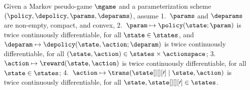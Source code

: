 
\begin{assumption}
\label{assum:param_lipschitz}
Given a Markov pseudo-game $\mgame$ and a parameterization scheme $(\policy, \depolicy, \params, \deparams)$, assume
1.~$\params$ and $\deparams$ are non-empty, compact, and convex,
2.~$\param \mapsto \policy (\state; \param)$ is twice continuously differentiable, for all $\state \in \states$, and $\deparam \mapsto \depolicy (\state, \action; \deparam)$ is twice continuously differentiable, for all $(\state, \action) \in \states \times \actionspace$;
3.~$\action \mapsto \reward (\state, \action)$ is twice continuously differentiable, for all $\state \in \states$;
4.~$\action \mapsto \trans
(\state[][][\prime] \mid \state, 
\action)$ 
is twice continuously differentiable, for all $\state, \state[][][\prime] \in \states$.
\end{assumption}


